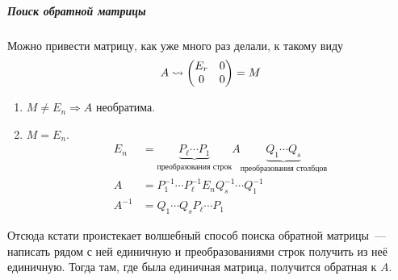 \documentclass[12pt]{../../../notes}
\begin{document}
\subparagraph{Поиск обратной матрицы}
Можно привести матрицу, как уже много раз делали, к такому виду
\[
  A \rightsquigarrow 
  \begin{pmatrix}
    E_r & 0 \cr
    0  & 0 \cr
  \end{pmatrix} = M
\]
\begin{enumerate}[1)]
  \item $M \neq E_n \Rightarrow A$ необратима. 
  \item $M = E_n$.
    \begin{align*}
      E_n &= \underbrace{P_\ell \dotsm P_1}_{\text{преобразования строк}}  A 
      \underbrace{Q_1 \dotsm Q_s}_{\text{преобразования столбцов}} \\
      A &= P_1^{-1} \dotsm P_\ell^{-1} E_n Q_s^{-1} \dotsm Q_1^{-1} \\
      A^{-1} &=  Q_1 \dotsm Q_s P_\ell \dotsm P_1
    \end{align*}
\end{enumerate}
Отсюда кстати проистекает волшебный способ поиска обратной матрицы~--- написать рядом с ней
единичную и преобразованиями строк получить из неё единичную. Тогда там, где была единичная
матрица, получится обратная к $A$.
\end{document}
